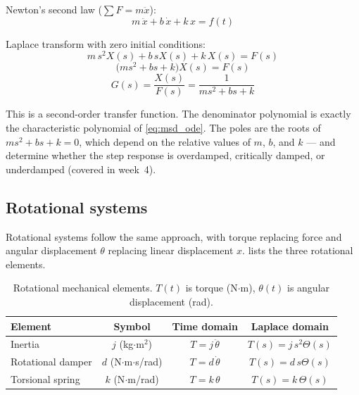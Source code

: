\documentclass[../../book.tex]{subfiles}
\begin{document}
Newton's second law ($\sum F = m\ddot{x}$):
\begin{equation}
  m \, \ddot{x} + b \, \dot{x} + k \, x = f(t)
  \label{eq:msd_ode}
\end{equation}

Laplace transform with zero initial conditions:
\[
  m \, s^2 X(s) + b \, s X(s) + k \, X(s) = F(s)
\]
\[
  \bigl(m s^2 + b s + k\bigr)X(s) = F(s)
\]
\begin{equation}
  G(s) = \frac{X(s)}{F(s)} = \frac{1}{m s^2 + b s + k}
  \label{eq:msd_tf}
\end{equation}

This is a second-order transfer function.  The denominator polynomial is
exactly the characteristic polynomial of \cref{eq:msd_ode}.  The poles are
the roots of $m s^2 + b s + k = 0$, which depend on the relative values of
$m$, $b$, and $k$ --- and determine whether the step response is overdamped,
critically damped, or underdamped (covered in week~4).

\subsection{Rotational systems}
\label{sec:rotation}

Rotational systems follow the same approach, with torque replacing force and
angular displacement $\theta$ replacing linear displacement $x$.
 lists the three rotational elements.

\begin{table}[htbp]
\centering
\caption{Rotational mechanical elements.  $T(t)$ is torque (N$\cdot$m),
  $\theta(t)$ is angular displacement (rad).}
\label{tab:rotational}
\begin{tabular}{lccc}
\toprule
Element & Symbol & Time domain & Laplace domain \\
\midrule
Inertia          & $j$ (kg$\cdot$m$^2$) & $T = j\,\ddot{\theta}$  & $T(s) = j\,s^2\Theta(s)$ \\[4pt]
Rotational damper & $d$ (N$\cdot$m$\cdot$s/rad) & $T = d\,\dot{\theta}$ & $T(s) = d\,s\Theta(s)$ \\[4pt]
Torsional spring  & $k$ (N$\cdot$m/rad) & $T = k\,\theta$ & $T(s) = k\,\Theta(s)$ \\[4pt]
\bottomrule
\end{tabular}
\end{table}
\end{document}
